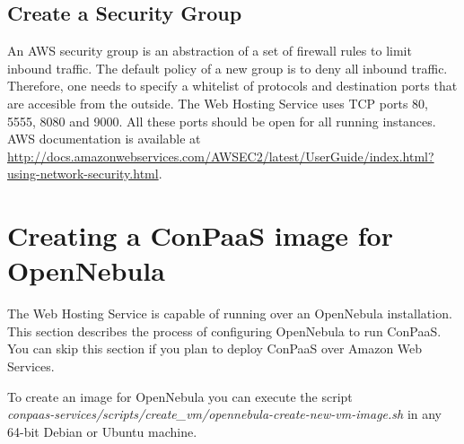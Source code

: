 \documentclass[10pt]{article}
\begin{document}
\subsection{Create a Security Group}

An AWS security group is an abstraction of a set of firewall rules to
limit inbound traffic. The default policy of a new group is to deny
all inbound traffic. Therefore, one needs to specify a whitelist of
protocols and destination ports that are accesible from the outside.
The Web Hosting Service uses TCP ports 80, 5555, 8080 and 9000. All
these ports should be open for all running instances.  AWS
documentation is available at
\url{http://docs.amazonwebservices.com/AWSEC2/latest/UserGuide/index.html?using-network-security.html}.

\section{Creating a ConPaaS image for OpenNebula}
\label{sec:oneimage}

The Web Hosting Service is capable of running over an OpenNebula
installation. This section describes the process of configuring
OpenNebula to run ConPaaS. You can skip this section if you plan to
deploy ConPaaS over Amazon Web Services.

To create an image for OpenNebula you can execute the script\\
\textit{conpaas-services/scripts/create\_vm/opennebula-create-new-vm-image.sh} in any
64-bit Debian or Ubuntu machine.
\end{document}
